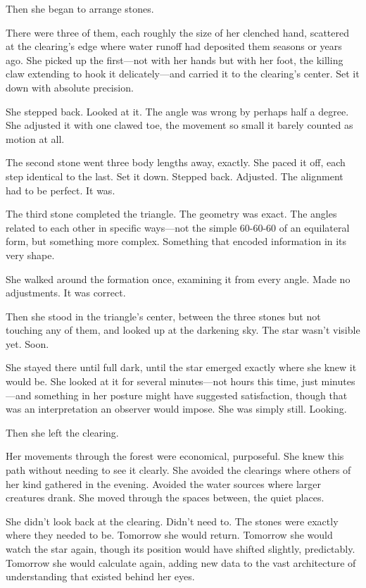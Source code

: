 Then she began to arrange stones.

There were three of them, each roughly the size of her clenched hand, scattered at the clearing's edge where water runoff had deposited them seasons or years ago. She picked up the first—not with her hands but with her foot, the killing claw extending to hook it delicately—and carried it to the clearing's center. Set it down with absolute precision.

She stepped back. Looked at it. The angle was wrong by perhaps half a degree. She adjusted it with one clawed toe, the movement so small it barely counted as motion at all.

The second stone went three body lengths away, exactly. She paced it off, each step identical to the last. Set it down. Stepped back. Adjusted. The alignment had to be perfect. It was.

The third stone completed the triangle. The geometry was exact. The angles related to each other in specific ways—not the simple 60-60-60 of an equilateral form, but something more complex. Something that encoded information in its very shape.

She walked around the formation once, examining it from every angle. Made no adjustments. It was correct.

Then she stood in the triangle's center, between the three stones but not touching any of them, and looked up at the darkening sky. The star wasn't visible yet. Soon.

She stayed there until full dark, until the star emerged exactly where she knew it would be. She looked at it for several minutes—not hours this time, just minutes—and something in her posture might have suggested satisfaction, though that was an interpretation an observer would impose. She was simply still. Looking.

Then she left the clearing.

Her movements through the forest were economical, purposeful. She knew this path without needing to see it clearly. She avoided the clearings where others of her kind gathered in the evening. Avoided the water sources where larger creatures drank. She moved through the spaces between, the quiet places.

She didn't look back at the clearing. Didn't need to. The stones were exactly where they needed to be. Tomorrow she would return. Tomorrow she would watch the star again, though its position would have shifted slightly, predictably. Tomorrow she would calculate again, adding new data to the vast architecture of understanding that existed behind her eyes.

